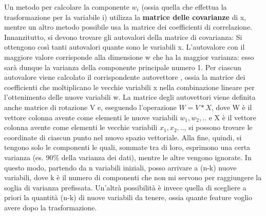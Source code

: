 Un metodo per calcolare la componente $w_i$ (ossia quella che effettua la trasformazione per la variabile i) utilizza la \textbf{matrice delle covarianze} di x, mentre un altro metodo possibile usa la matrice dei coefficienti di correlazione. Innanzitutto, si devono trovare gli autovalori della matrice di covarianza: Si ottengono così tanti autovalori quante sono le variabili x. L'autovalore con il maggiore valore corrisponde alla dimensione w che ha la maggior varianza: esso sarà dunque la varianza della componente principale numero 1. Per ciascun autovalore viene calcolato il corrispondente autovettore , ossia la matrice dei coefficienti che moltiplicano le vecchie variabili x nella combinazione lineare per l'ottenimento delle nuove variabili w. La matrice degli autovettori viene definita anche matrice di rotazione V e, eseguendo l'operazione $W = V*X $, dove W è il vettore colonna avente come elementi le nuove variabili $w_1,w_2,..$ e X è il vettore colonna avente come elementi le vecchie variabili $x_1,x_2,..$, si possono trovare le coordinate di ciascun punto nel nuovo spazio vettoriale. Alla fine, quindi, si tengono solo le componenti le quali, sommate tra di loro, esprimono una certa varianza (es. 90\% della varianza dei dati), mentre le altre vengono ignorate. In questo modo, partendo da n variabili iniziali, posso arrivare a (n-k) nuove variabili, dove k è il numero di componenti che non mi servono per raggiungere la soglia di varianza prefissata. Un'altrà possibilità è invece quella di scegliere a priori la quantità (n-k) di nuove variabili da tenere, ossia quante feature voglio avere dopo la trasformazione.
